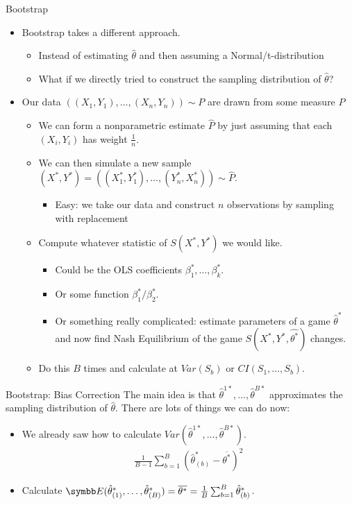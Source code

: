 \documentclass[aspectratio=169,11pt]{beamer}
\begin{document}
\begin{frame}{Bootstrap}
\begin{itemize}
\item Bootstrap takes a different approach.
\begin{itemize}
\item Instead of estimating $\hat{\theta}$ and then assuming a Normal/t-distribution
\item What if we directly tried to construct the \alert{sampling distribution} of $\hat{\theta}$?
\end{itemize}
\item Our data $((X_1,Y_1),\ldots,(X_n,Y_n)) \sim P$ are drawn from some measure $P$
\begin{itemize}
\item We can form a \alert{nonparametric estimate} $\hat{P}$ by just assuming that each $(X_i,Y_i)$ has weight $\frac{1}{n}$.
\item We can then simulate a new sample $(X^{*},Y^{*}) = ((X_1^{*},Y_1^{*}),\ldots, (Y_n^{*}, X_n^{*})) \sim \hat{P}$.
\begin{itemize}
\item Easy: we take our data and construct $n$ observations by \alert{sampling with replacement} 
\end{itemize}
\item Compute whatever statistic of $S(X^*,Y^*)$ we would like.
\begin{itemize}
\item Could be the OLS coefficients $\beta_1^{*},\ldots, \beta_k^{*}$.
\item Or some function $\beta_1^{*}/\beta_2^{*}$.
\item Or something really complicated: estimate parameters of a game $\hat{\theta}^*$ and now find Nash Equilibrium of the game $S(X^{*},Y^{*},\hat{\theta^*})$ changes.
\end{itemize}
\item Do this $B$ times and calculate at $Var(S_b)$ or $CI(S_1,\ldots, S_b)$.
\end{itemize}
\end{itemize}
\end{frame}


\begin{frame}{Bootstrap: Bias Correction}
\small
The main idea is that $\hat{\theta}^{1*},\ldots, \hat{\theta}^{B*}$ approximates the \alert{sampling distribution} of $\hat{\theta}$. There are lots of things we can do now:
\begin{itemize}
\item We already saw how to calculate $Var(\hat{\theta}^{1*},\ldots, \hat{\theta}^{B*})$.
\begin{eqnarray*}
\frac{1}{B-1} \sum_{b=1}^B (\hat{\theta}_{(b)}^* - \overline{\theta^{*}})^2
\end{eqnarray*}
\item Calculate $\E(\hat{\theta}^{*}_{(1)},\ldots, \hat{\theta}^{*}_{(B)}) = \overline{\theta^{*}} = \frac{1}{B} \sum_{b=1}^B \hat{\theta}_{(b)}^*$.
\end{itemize}
\end{frame}
\end{document}
